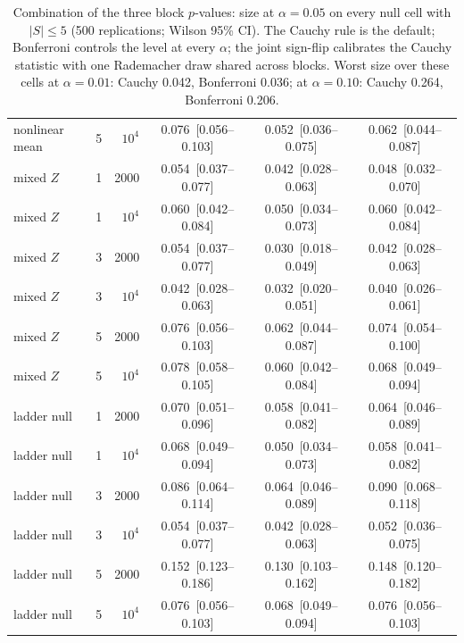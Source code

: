 \begin{table}[t]
{\begin{tabular}{llrccc}
nonlinear mean & 5 & $10^4$ & 0.076~[0.056--0.103] & 0.052~[0.036--0.075] & 0.062~[0.044--0.087] \\
mixed $Z$ & 1 & 2000 & 0.054~[0.037--0.077] & 0.042~[0.028--0.063] & 0.048~[0.032--0.070] \\
mixed $Z$ & 1 & $10^4$ & 0.060~[0.042--0.084] & 0.050~[0.034--0.073] & 0.060~[0.042--0.084] \\
mixed $Z$ & 3 & 2000 & 0.054~[0.037--0.077] & 0.030~[0.018--0.049] & 0.042~[0.028--0.063] \\
mixed $Z$ & 3 & $10^4$ & 0.042~[0.028--0.063] & 0.032~[0.020--0.051] & 0.040~[0.026--0.061] \\
mixed $Z$ & 5 & 2000 & 0.076~[0.056--0.103] & 0.062~[0.044--0.087] & 0.074~[0.054--0.100] \\
mixed $Z$ & 5 & $10^4$ & 0.078~[0.058--0.105] & 0.060~[0.042--0.084] & 0.068~[0.049--0.094] \\
ladder null & 1 & 2000 & 0.070~[0.051--0.096] & 0.058~[0.041--0.082] & 0.064~[0.046--0.089] \\
ladder null & 1 & $10^4$ & 0.068~[0.049--0.094] & 0.050~[0.034--0.073] & 0.058~[0.041--0.082] \\
ladder null & 3 & 2000 & 0.086~[0.064--0.114] & 0.064~[0.046--0.089] & 0.090~[0.068--0.118] \\
ladder null & 3 & $10^4$ & 0.054~[0.037--0.077] & 0.042~[0.028--0.063] & 0.052~[0.036--0.075] \\
ladder null & 5 & 2000 & 0.152~[0.123--0.186] & 0.130~[0.103--0.162] & 0.148~[0.120--0.182] \\
ladder null & 5 & $10^4$ & 0.076~[0.056--0.103] & 0.068~[0.049--0.094] & 0.076~[0.056--0.103] \\
\bottomrule
\end{tabular}}
\caption{Combination of the three block $p$-values: size at $\alpha=0.05$ on every null cell with $|S|\le5$ (500 replications; Wilson 95\% CI). The Cauchy rule is the default; Bonferroni controls the level at every $\alpha$; the joint sign-flip calibrates the Cauchy statistic with one Rademacher draw shared across blocks. Worst size over these cells at $\alpha=0.01$: Cauchy 0.042, Bonferroni 0.036; at $\alpha=0.10$: Cauchy 0.264, Bonferroni 0.206.}
\label{tab:combrule}
\end{table}
